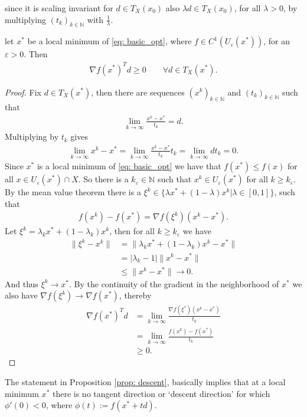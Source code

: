 since it is scaling invariant for $d \in T_X(x_0)$ also $\lambda d \in
T_X(x_0)$, for all $\lambda > 0$, by multiplying $(t_k)_{k \in \mathbb{N} }$
with $\frac{1}{\lambda}$.
\begin{proposition}
    \label{prop: descent}
    let $x^{*}$ be a local minimum of \ref{eq: basic_opt}, where $f \in
    C^1(U_{\varepsilon}(x^{*}))$, for an $\varepsilon >0$. Then
    \begin{align}
        \nabla f(x^{*})^{T}d \ge 0 \qquad \forall d \in T_X(x^{*}).
    \end{align}
\end{proposition}
\begin{proof}
Fix $d \in T_X(x^{*})$, then there are sequences $(x^{k})_{k \in \mathbb{N} }$
and $(t_k)_{k \in \mathbb{N}}$ such that
\begin{align}
    \lim_{k \to \infty} \frac{x^{k}-x^{*}}{t_k} = d.
\end{align}
Multiplying by $t_k$ gives
\begin{align}
   \lim_{k \to \infty} x^{k} - x^{*} =
   \lim_{k \to \infty}  \frac{x^{k}-x^{*}  }{t_k}t_k =
   \lim_{k \to \infty} dt_k = 0.
\end{align}
Since $x^{*}$ is a local minimum of \ref{eq: basic_opt} we have that
$f(x^{*}) \le f(x)$ for all $x \in U_\varepsilon(x^{*}) \cap X$. So there is
a $k_\varepsilon \in \mathbb{N}$ such that $x^{k} \in U_\varepsilon(x^{*})$
for all $k\ge k_\varepsilon$. By the mean value theorem there is a $\xi^{k}
\in \{\lambda x^{*} + (1-\lambda)x^{k}| \lambda \in [0, 1]  \} $, such that
\begin{align}
    f(x^{k}) - f(x^{*} ) = \nabla f(\xi^{k} )(x^{k} -x^{*} ).
\end{align}
Let $\xi^{k} = \lambda_k x^{*} + (1-\lambda_k)x^{k}$, then for all $k \ge
k_\varepsilon$ we have
\begin{align}
    \|\xi^{k} -x^{k} \| &= \|\lambda_k x^{*} + (1-\lambda_k) x^{k}
    -x^{*}\| \\
                &=|\lambda_k-1| \| x^{k}  - x^{*} \|\\
                &\le \| x^{k}  - x^{*} \| \to 0.
\end{align}
And thus $\xi^{k} \to x^{*}$. By the continuity of the gradient in the
neighborhood of $x^{*}$ we also have $\nabla f(\xi^{k}) \to \nabla f(x^{*})$,
thereby
\begin{align}
    \nabla f(x^{*})^{T} d &= \lim_{k \to \infty} \frac{\nabla f(\xi^{*})
    (x^{k}-x^{*})}{t_k} \\
              &=\lim_{k \to \infty} \frac{f(x^{k}) - f(x^{*})  }{t_{k} } \\
              &\ge 0.
\end{align}
\end{proof}
The statement in Proposition \ref{prop: descent}, basically implies that at a
local minimum $x^{*}$ there is no tangent direction or `descent direction'
for which $\phi '(0) < 0$, where $\phi(t) := f(x^{*} + t d)$.

